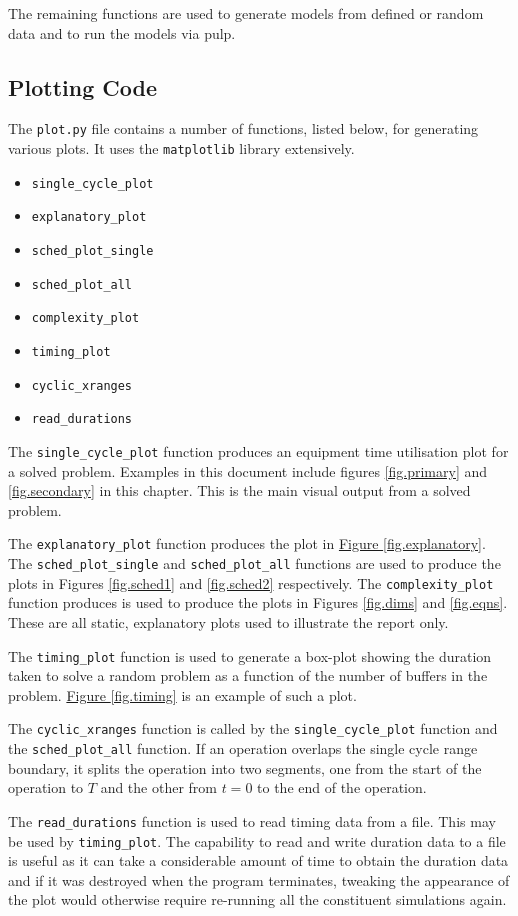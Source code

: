 The remaining functions are used to generate models from defined or random
data and to run the models via pulp.

\subsection{Plotting Code}\label{SS.plotcode}

The \texttt{plot.py} file contains a number of functions, listed below, for
generating various plots.  It uses the \texttt{matplotlib} library extensively.
\begin{itemize}
    \item \texttt{single\_cycle\_plot}
    \item \texttt{explanatory\_plot}
    \item \texttt{sched\_plot\_single}
    \item \texttt{sched\_plot\_all}
    \item \texttt{complexity\_plot}
    \item \texttt{timing\_plot}
    \item \texttt{cyclic\_xranges}
    \item \texttt{read\_durations}
\end{itemize}

The \texttt{single\_cycle\_plot} function produces an equipment time
utilisation plot for a solved problem. Examples in this document include
figures \ref{fig.primary} and \ref{fig.secondary} in this chapter.  This is the
main visual output from a solved problem.

\sloppy
The \texttt{explanatory\_plot} function produces the plot in
\hyperref[fig.explanatory]{Figure \ref*{fig.explanatory}}.
The \texttt{sched\_plot\_single} and \texttt{sched\_plot\_all} functions are
used to produce the plots in Figures \ref{fig.sched1} and \ref{fig.sched2}
respectively.
The \texttt{complexity\_plot} function produces is used to produce the plots
in Figures \ref{fig.dims} and \ref{fig.eqns}.
These are all static, explanatory plots used to illustrate the
report only.

\fussy
The \texttt{timing\_plot} function is used to generate a box-plot showing the 
duration taken to solve a random problem as a function of the number of buffers
in the problem. \hyperref[fig.timing]{Figure \ref*{fig.timing}} is an example
of such a plot.

The \texttt{cyclic\_xranges} function is called by the
\texttt{single\_cycle\_plot} function and the \texttt{sched\_plot\_all}
function.
If an operation overlaps the single cycle range boundary, it splits the
operation into two segments, one from the start of the operation to $T$ and the
other from $t=0$ to the end of the operation.

The \texttt{read\_durations} function is used to read timing data from a file.
This may be used by \texttt{timing\_plot}.  The capability to read and write
duration data to a file is useful as it can take a considerable amount of time
to obtain the duration data and if it was destroyed when the program
terminates, tweaking the appearance of the plot would otherwise require
re-running all the constituent simulations again.
